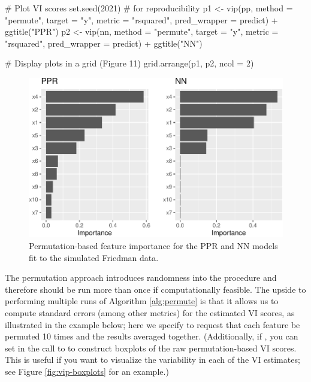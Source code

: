 \begin{Schunk}
\begin{Sinput}
# Plot VI scores
set.seed(2021)  # for reproducibility
p1 <- vip(pp, method = "permute", target = "y", metric = "rsquared",
          pred_wrapper = predict) + ggtitle("PPR")
p2 <- vip(nn, method = "permute", target = "y", metric = "rsquared",
          pred_wrapper = predict) + ggtitle("NN")

# Display plots in a grid (Figure 11)
grid.arrange(p1, p2, ncol = 2)
\end{Sinput}
\begin{figure}[!htb]

{\centering \includegraphics[width=0.7\linewidth]{greenwell-boehmke_files/figure-latex/vip-permute-ppr-nn-1}

}

\caption[Permutation-based feature importance for the PPR and NN models fit to the simulated Friedman data]{Permutation-based feature importance for the PPR and NN models fit to the simulated Friedman data.}\label{fig:vip-permute-ppr-nn}
\end{figure}
\end{Schunk}

The permutation approach introduces randomness into the procedure and
therefore should be run more than once if computationally feasible. The
upside to performing multiple runs of Algorithm \ref{alg:permute} is
that it allows us to compute standard errors (among other metrics) for
the estimated VI scores, as illustrated in the example below; here we
specify  to request that each feature be permuted 10
times and the results averaged together. (Additionally, if
, you can set  in the call to
 to construct boxplots of the raw permutation-based VI
scores. This is useful if you want to visualize the variability in each
of the VI estimates; see Figure \ref{fig:vip-boxplots} for an example.)

